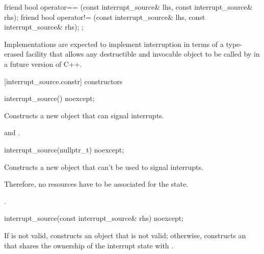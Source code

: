 {\begin{codeblock}
{{    friend bool operator== (const interrupt_source& lhs, const interrupt_source& rhs);
    friend bool operator!= (const interrupt_source& lhs, const interrupt_source& rhs);
  };
}
\end{codeblock}


{\color{diffcolor}
\begin{note} Implementations are expected to implement interruption in terms of a
             type-erased facility that allows any destructible and invocable object
             to be called by  in a future version of C++.
             \end{note}
}

[interrupt_source.constr]{ constructors}

%
\begin{itemdecl}
interrupt_source() noexcept;
\end{itemdecl}
\begin{itemdescr}
  \pnum\effects Constructs a new  object that can signal interrupts.

  \pnum\postconditions {} and .
\end{itemdescr}

%
\begin{itemdecl}
interrupt_source(nullptr_t) noexcept;
\end{itemdecl}
\begin{itemdescr}
  \pnum\effects Constructs a new  object that can't be used to signal interrupts.
                \begin{note} Therefore, no resources have to be associated for the state.  \end{note}

  \pnum\postconditions {}.
\end{itemdescr}


%
\begin{itemdecl}
interrupt_source(const interrupt_source& rhs) noexcept;
\end{itemdecl}
\begin{itemdescr}
  \pnum\effects If  is not valid, constructs an  object
                that is not valid;
                otherwise, constructs an 
                that shares the ownership of the interrupt state with .


\end{itemdescr}}
